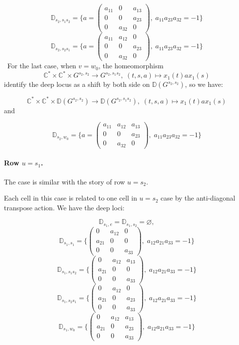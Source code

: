 \documentclass[12pt]{amsart}
\newcommand{\C}{\mathbb C}
\newcommand{\D}{\mathbb D}
\theoremstyle{plain}
\theoremstyle{definition}
\theoremstyle{remark}
\begin{document}
\[
\D_{s_2,s_1s_2}
=\{a=\!\left(
\begin{array}{ccc}
a_{11}&0&a_{13}\\
0&0&a_{23}\\
0&a_{32}&0
\end{array}
\right)\!,\; a_{11}a_{23}a_{32}=-1\}
\]
\[
\D_{s_2,s_2s_1}
=\{a=\!\left(
\begin{array}{ccc}
a_{11}&a_{12}&0\\
0&0&a_{23}\\
0&a_{32}&0
\end{array}
\right)\!,\; a_{11}a_{23}a_{32}=-1\}
\]
\
For the last case, when $v=w_0$, the homeomorphism
$$\C^*\times \C^* \times G^{s_2,s_2}\to G^{s_2,s_1s_2},\; (t,s ,a) \mapsto x_1(t) a x_1(s)$$
identify the deep locus as a shift by both side on $\D(G^{s_2,s_2})$, so we have:

$$\C^*\times \C^* \times \D(G^{s_2,s_2})\to \D(G^{s_2,s_1s_2}),\; (t,s ,a) \mapsto x_1(t) a x_1(s)$$
and

\[
\D_{s_2,w_0}
=\{a=\!\left(
\begin{array}{ccc}
a_{11}&a_{12}&a_{13}\\
0&0&a_{23}\\
0&a_{32}&0
\end{array}
\right)\!,\; a_{11}a_{23}a_{32}=-1\}
\]

\paragraph{\bf Row \(u=s_1\).}
The case is similar with the story of row $u=s_2$.

Each cell in this case is related to one cell in $u=s_2$ case by the anti-diagonal transpose action. We have the deep loci:

\[
\D_{s_1,e}=\D_{s_1,s_2}=\varnothing,
\]
\[
\D_{s_1,s_1}
=\{\!\left(
\begin{array}{ccc}
0&a_{12}&0\\
a_{21}&0&0\\
0&0&a_{33}
\end{array}
\right)\!,\;a_{12}a_{21}a_{33}=-1\}
\]
\[
\D_{s_1,s_1s_2}
=\{\!\left(
\begin{array}{ccc}
0&a_{12}&a_{13}\\
a_{21}&0&0\\
0&0&a_{33}
\end{array}
\right)\!,\;a_{12}a_{21}a_{33}=-1\}
\]
\[
\D_{s_1,s_2s_1}
=\{\!\left(
\begin{array}{ccc}
0&a_{12}&0\\
a_{21}&0&a_{23}\\
0&0&a_{33}
\end{array}
\right)\!,\;a_{12}a_{21}a_{33}=-1\}
\]
\[
\D_{s_1,w_0}
=\{\!\left(
\begin{array}{ccc}
0&a_{12}&a_{13}\\
a_{21}&0&a_{23}\\
0&0&a_{33}
\end{array}
\right)\!,\;a_{12}a_{21}a_{33}=-1\}
\]
\end{document}
